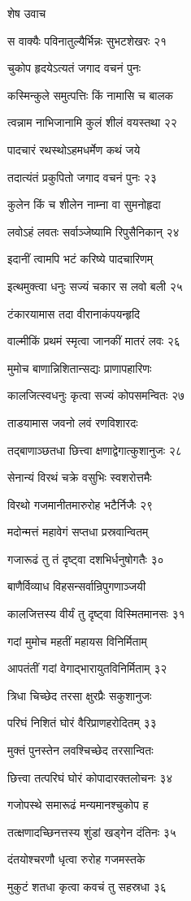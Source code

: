 शेष उवाच

स वाक्यैः पविनातुल्यैर्भिन्नः सुभटशेखरः २१

चुकोप हृदयेऽत्यतं जगाद वचनं पुनः

कस्मिन्कुले समुत्पत्तिः किं नामासि च बालक

त्वन्नाम नाभिजानामि कुलं शीलं वयस्तथा २२

पादचारं रथस्थोऽहमधर्मेण कथं जये

तदात्यंतं प्रकुपितो जगाद वचनं पुनः २३

कुलेन किं च शीलेन नाम्ना वा सुमनोहृदा

लवोऽहं लवतः सर्वाञ्जेष्यामि रिपुसैनिकान् २४

इदानीं त्वामपि भटं करिष्ये पादचारिणम्

इत्थमुक्त्वा धनुः सज्यं चकार स लवो बली २५

टंकारयामास तदा वीरानाकंपयन्हृदि

वाल्मीकिं प्रथमं स्मृत्वा जानकीं मातरं लवः २६

मुमोच बाणान्निशितान्सद्यः प्राणापहारिणः

कालजित्स्वधनुः कृत्वा सज्यं कोपसमन्वितः २७

ताडयामास जवनो लवं रणविशारदः

तद्बाणाञ्छतधा छित्त्वा क्षणाद्वेगात्कुशानुजः २८

सेनान्यं विरथं चक्रे वसुभिः स्वशरोत्तमैः

विरथो गजमानीतमारुरोह भटैर्निजैः २९

मदोन्मत्तं महावेगं सप्तधा प्रस्रवान्वितम्

गजारूढं तु तं दृष्ट्वा दशभिर्धनुषोगतैः ३०

बाणैर्विव्याध विहसन्सर्वान्रिपुगणाञ्जयी

कालजित्तस्य वीर्यं तु दृष्ट्वा विस्मितमानसः ३१

गदां मुमोच महतीं महायस विनिर्मिताम्

आपतंतीं गदां वेगाद्भारायुतविनिर्मिताम् ३२

त्रिधा चिच्छेद तरसा क्षुरप्रैः सकुशानुजः

परिघं निशितं घोरं वैरिप्राणहरोदितम् ३३

मुक्तं पुनस्तेन लवश्चिच्छेद तरसान्वितः

छित्त्वा तत्परिघं घोरं कोपादारक्तलोचनः ३४

गजोपस्थे समारूढं मन्यमानश्चुकोप ह

तत्क्षणादच्छिनत्तस्य शुंडां खड्गेन दंतिनः ३५

दंतयोश्चरणौ धृत्वा रुरोह गजमस्तके

मुकुटं शतधा कृत्वा कवचं तु सहस्रधा ३६


